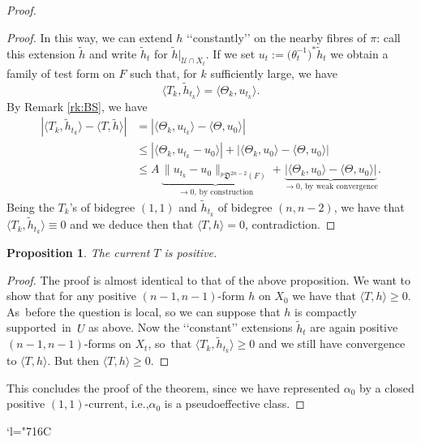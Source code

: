 \documentclass[11pt]{article}
\newcommand{\ie}{i.e.,\xspace}
\let\mathcal\mathscr
\newcommand{\Changelback}{\mathcode`l="716C}
\theoremstyle{plain}
\newtheorem{proposition}[theorem]{Proposition}
\theoremstyle{definition}
\begin{document}
\begin{appendix}
\begin{proof}
\begin{proof}
In this way, we can extend $h$ \lq\lq constantly\rq\rq{} on the nearby fibres of $\pi$: call this extension $\tilde h$ and write $\tilde h_t$ for $\tilde h|_{\mathcal U\cap X_t}$. If we set $u_t:=\bigl(\theta_t^{-1}\bigr)^*\tilde h_t$ we obtain a family of test form on $F$ such that, for $k$ sufficiently large, we have
\[
\langle T_k,\tilde h_{t_k}\rangle=\langle\Theta_k,u_{t_k}\rangle.
\]
By Remark \ref{rk:BS}, we have
\[
\begin{aligned}
|\langle T_k,\tilde h_{t_k}\rangle-\langle T,\tilde h\rangle| &= |\langle\Theta_k,u_{t_k}\rangle-\langle\Theta,u_{0}\rangle| \\
&\le |\langle\Theta_k,u_{t_k}-u_0\rangle|+|\langle\Theta_k,u_0\rangle-\langle\Theta,u_0\rangle|\\
&\le A\,\underbrace{\|u_{t_k}-u_0\|_{^p\mathfrak D^{2n-2}(F)}}_{\textrm{$\to 0$, by construction}}+\underbrace{|\langle\Theta_k,u_0\rangle-\langle\Theta,u_0\rangle|}_{\textrm{$\to 0$, by weak convergence}}.
\end{aligned}
\]
Being the $T_k$'s of bidegree $(1,1)$ and $\tilde h_{t_k}$ of bidegree $(n,n-2)$, we have that \hbox{$\langle T_k,\tilde h_{t_k}\rangle\equiv 0$} and we deduce then that $\langle T,h\rangle=0$, contradiction.
\end{proof}

\begin{proposition}
The current $T$ is positive.
\end{proposition}

\begin{proof}
The proof is almost identical to that of the above proposition. We want to show that for any positive $(n-1,n-1)$-form $h$ on $X_0$ we have that $\langle T,h\rangle\ge 0$. As~before the question is local, so we can suppose that $h$ is compactly supported~in~$U$ as above. Now the \lq\lq constant\rq\rq{} extensions $\tilde h_t$ are again positive $(n-1,n-1)$-forms on $X_t$, so~that $\langle T_k,\tilde h_{t_k}\rangle\ge 0$ and we still have convergence to $\langle T,h\rangle$. But then $\langle T,h\rangle\ge 0$.
\end{proof}

This concludes the proof of the theorem, since we have represented $\alpha_0$ by a closed positive $(1,1)$-current, \ie $\alpha_0$ is a pseudoeffective class.
\end{proof}

\end{appendix}

\Changelback
\end{document}
